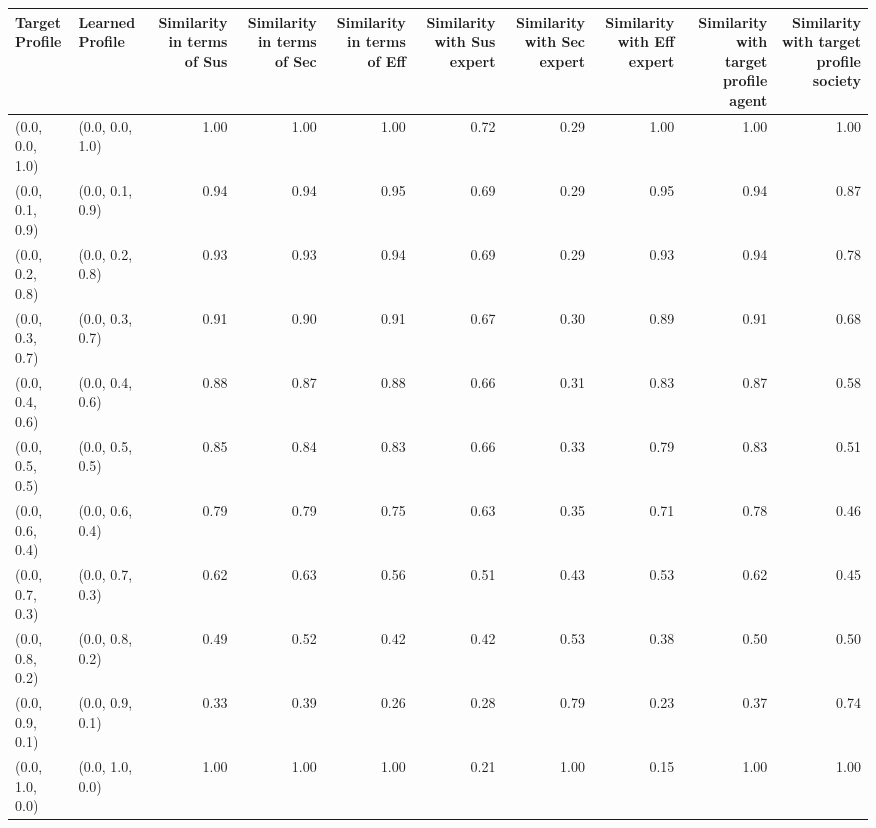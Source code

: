 \begin{tabular}{llrrrrrrrr}
\toprule
Target Profile & Learned Profile & Similarity in terms of Sus & Similarity in terms of Sec & Similarity in terms of Eff & Similarity with Sus expert & Similarity with Sec expert & Similarity with Eff expert & Similarity with target profile agent & Similarity with target profile society \\
\midrule
(0.0, 0.0, 1.0) & (0.0, 0.0, 1.0) & 1.00 & 1.00 & 1.00 & 0.72 & 0.29 & 1.00 & 1.00 & 1.00 \\
(0.0, 0.1, 0.9) & (0.0, 0.1, 0.9) & 0.94 & 0.94 & 0.95 & 0.69 & 0.29 & 0.95 & 0.94 & 0.87 \\
(0.0, 0.2, 0.8) & (0.0, 0.2, 0.8) & 0.93 & 0.93 & 0.94 & 0.69 & 0.29 & 0.93 & 0.94 & 0.78 \\
(0.0, 0.3, 0.7) & (0.0, 0.3, 0.7) & 0.91 & 0.90 & 0.91 & 0.67 & 0.30 & 0.89 & 0.91 & 0.68 \\
(0.0, 0.4, 0.6) & (0.0, 0.4, 0.6) & 0.88 & 0.87 & 0.88 & 0.66 & 0.31 & 0.83 & 0.87 & 0.58 \\
(0.0, 0.5, 0.5) & (0.0, 0.5, 0.5) & 0.85 & 0.84 & 0.83 & 0.66 & 0.33 & 0.79 & 0.83 & 0.51 \\
(0.0, 0.6, 0.4) & (0.0, 0.6, 0.4) & 0.79 & 0.79 & 0.75 & 0.63 & 0.35 & 0.71 & 0.78 & 0.46 \\
(0.0, 0.7, 0.3) & (0.0, 0.7, 0.3) & 0.62 & 0.63 & 0.56 & 0.51 & 0.43 & 0.53 & 0.62 & 0.45 \\
(0.0, 0.8, 0.2) & (0.0, 0.8, 0.2) & 0.49 & 0.52 & 0.42 & 0.42 & 0.53 & 0.38 & 0.50 & 0.50 \\
(0.0, 0.9, 0.1) & (0.0, 0.9, 0.1) & 0.33 & 0.39 & 0.26 & 0.28 & 0.79 & 0.23 & 0.37 & 0.74 \\
(0.0, 1.0, 0.0) & (0.0, 1.0, 0.0) & 1.00 & 1.00 & 1.00 & 0.21 & 1.00 & 0.15 & 1.00 & 1.00 \\
\bottomrule
\end{tabular}
